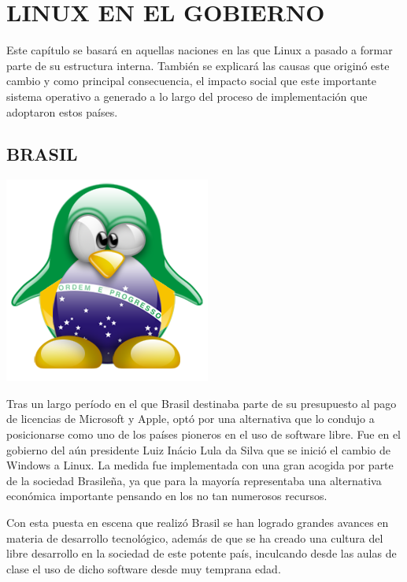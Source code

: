 \chapter*{LINUX EN EL GOBIERNO}
Este capítulo se basará en aquellas naciones en las que Linux a pasado a formar parte de su estructura interna. También se explicará las causas que originó este cambio y como 
principal consecuencia, el impacto social que este importante sistema operativo a generado a lo largo del proceso de implementación que adoptaron estos países.

\section*{BRASIL}
\includegraphics[scale=0.5]{img/cp03/img0301.png}

Tras un largo período en el que Brasil destinaba parte de su presupuesto al pago de licencias de Microsoft y Apple, optó por una alternativa que lo condujo a posicionarse como 
uno de los países pioneros en el uso de software libre. Fue en el gobierno del aún presidente Luiz Inácio Lula da Silva que se inició el cambio de Windows a Linux. La medida fue 
implementada con una gran acogida por parte de la sociedad Brasileña, ya que para la mayoría representaba una alternativa económica importante pensando en los no tan numerosos 
recursos.                                                 
                                                                                                                                  
Con esta puesta en escena que realizó Brasil se han logrado grandes avances en materia de desarrollo tecnológico, además de que se ha creado una cultura del libre desarrollo en 
la sociedad de este potente país, inculcando desde las aulas de clase el uso de dicho software desde muy temprana edad.                                                          
                                                                                                                                  
